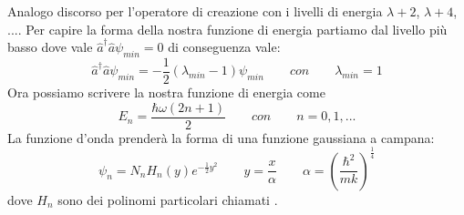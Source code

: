 Analogo discorso per l'operatore di creazione con i livelli di energia $\lambda+2$, $ \lambda+4$, .... Per capire la forma della nostra funzione di energia partiamo dal livello più basso dove vale $\hat{a}^{\dagger}\hat{a}\psi_{min} = 0$ di conseguenza vale:
$$\hat{a}^{\dagger}\hat{a}\psi_{min} = -\frac{1}{2}(\lambda_{min}-1)\psi_{min} \qquad con \qquad \lambda_{min} = 1$$
Ora possiamo scrivere la nostra funzione di energia come
$$E_n = \frac{\hbar\omega(2n+1)}{2} \qquad con \qquad n = 0, 1, ...$$
La funzione d'onda prenderà la forma di una funzione gaussiana a campana:
$$\psi_n = N_n H_n(y)e^{-\frac{1}{2}y^2} \qquad y = \frac{x}{\alpha} \qquad \alpha = \left(\frac{\hbar^2}{mk}\right)^{\frac{1}{4}}$$
dove $H_n$ sono dei polinomi particolari chiamati .
